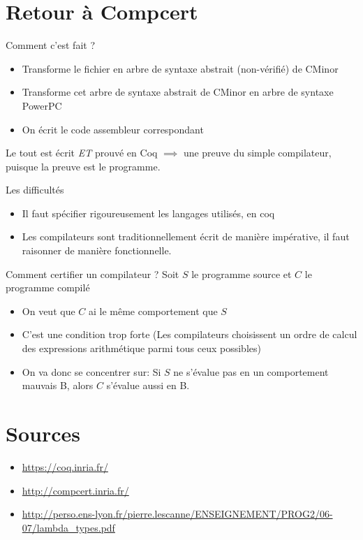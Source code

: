\documentclass[11pt,a4paper]{beamer}
\theoremstyle{plain}
\theoremstyle{definition}
\theoremstyle{remark}
\begin{document}
\section{Retour à Compcert}

\begin{frame}{Comment c'est fait ?}
	\begin{itemize}
		\item Transforme le fichier en arbre de syntaxe abstrait (non-vérifié) de CMinor
		\item Transforme cet arbre de syntaxe abstrait de CMinor en arbre de syntaxe PowerPC
		\item On écrit le code assembleur correspondant
	\end{itemize}
Le tout est écrit \emph{ET} prouvé en Coq $\implies$ une preuve du simple compilateur, puisque la preuve est le programme.
\end{frame}

\begin{frame}{Les difficultés}
	\begin{itemize}
		\item Il faut spécifier rigoureusement les langages utilisés, en coq
		\item Les compilateurs sont traditionnellement écrit de manière impérative, il faut raisonner de manière fonctionnelle.
	\end{itemize}
\end{frame}

\begin{frame}{Comment certifier un compilateur ?}
Soit $S$ le programme source et $C$ le programme compilé 
	\begin{itemize}
		\item On veut que $C$ ai le même comportement que $S$
		\item C'est une condition trop forte (Les compilateurs choisissent un ordre de calcul des expressions arithmétique parmi tous ceux possibles)
		\item On va donc se concentrer sur: Si $S$ ne s'évalue pas en un comportement mauvais B, alors $C$ s'évalue aussi en B.
	\end{itemize}
\end{frame}

\section*{Sources}
\begin{frame}
\begin{itemize}
	\item \url{https://coq.inria.fr/}
	\item \url{http://compcert.inria.fr/}
	\item \url{http://perso.ens-lyon.fr/pierre.lescanne/ENSEIGNEMENT/PROG2/06-07/lambda_types.pdf}
\end{itemize}
\end{frame}
\end{document}
